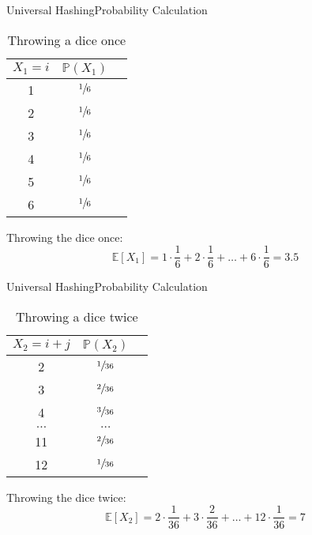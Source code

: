 
\begin{frame}{Universal Hashing}{Probability Calculation}
  \vspace*{-1.5em}
  \begin{table}[!h]
    \caption{Throwing a dice once}
    \label{tab:value_rolling_dice_once}
    \begin{tabularx}{0.25\linewidth}{c|cc}
      $X_1 = i$ & $\mathbb{P}(X_1)$\\
      \midrule
      1 & $\sfrac{1}{6}$\\
      2 & $\sfrac{1}{6}$\\
      3 & $\sfrac{1}{6}$\\
      4 & $\sfrac{1}{6}$\\
      5 & $\sfrac{1}{6}$\\
      6 & $\sfrac{1}{6}$\\
    \end{tabularx}
  \end{table}
  Throwing the dice once:
  \[\mathbb{E}[X_1] = 1 \cdot \frac{1}{6} + 2 \cdot \frac{1}{6}
    + \dots + 6 \cdot \frac{1}{6} = 3.5\]
\end{frame}


\begin{frame}{Universal Hashing}{Probability Calculation}
  \vspace*{-1.5em}
  \begin{table}[!h]
    \caption{Throwing a dice twice}
    \label{tab:value_rolling_dice_twice}
    \begin{tabularx}{0.275\linewidth}{c|cc}
      $X_2 = i + j$ & $\mathbb{P}(X_2)$\\
      \midrule
      2 & $\sfrac{1}{36}$\\
      3 & $\sfrac{2}{36}$\\
      4 & $\sfrac{3}{36}$\\
      $\dots$ & $\dots$\\
      11 & $\sfrac{2}{36}$\\
      12 & $\sfrac{1}{36}$\\
    \end{tabularx}
  \end{table}
  Throwing the dice twice:
  \[\mathbb{E}[X_2] = 2 \cdot \frac{1}{36} + 3 \cdot \frac{2}{36}
    + \dots + 12 \cdot \frac{1}{36} = 7\]
\end{frame}

